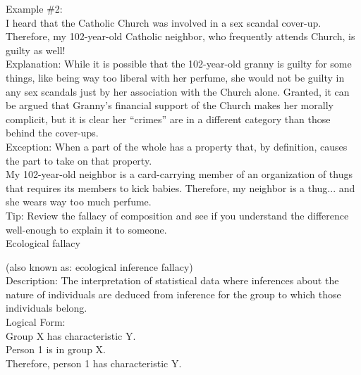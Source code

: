 \documentclass[a4paper,12pt,single,pdftex]{scrbook}
\begin{document}
    
      Example \#2:
    \\

    
      I heard that the Catholic Church was involved in a sex scandal cover-up.  Therefore, my 102-year-old Catholic neighbor, who frequently attends Church, is guilty as well!
    \\

    
      Explanation: While it is possible that the 102-year-old granny is guilty for some things, like being way too liberal with her perfume, she would not be guilty in any sex scandals just by her association with the Church alone. Granted, it can be argued that Granny’s financial support of the Church makes her morally complicit, but it is clear her “crimes” are in a different category than those behind the cover-ups.
    \\

    
      Exception: When a part of the whole has a property that, by definition, causes the part to take on that property.
    \\

    
      My 102-year-old neighbor is a card-carrying member of an organization of thugs that requires its members to kick babies.  Therefore, my neighbor is a thug... and she wears way too much perfume.
    \\

    
      Tip: Review the fallacy of composition and see if you understand the difference well-enough to explain it to someone.
    \\

  

Ecological fallacy
    
      (also known as: ecological inference fallacy)
    \\

  
    
      Description: The interpretation of statistical data where inferences about the nature of individuals are deduced from inference for the group to which those individuals belong.
    \\

    
      Logical Form:
    \\

    
      Group X has characteristic Y.
    \\

    
      Person 1 is in group X.
    \\

    
      Therefore, person 1 has characteristic Y.
    \\
\end{document}
